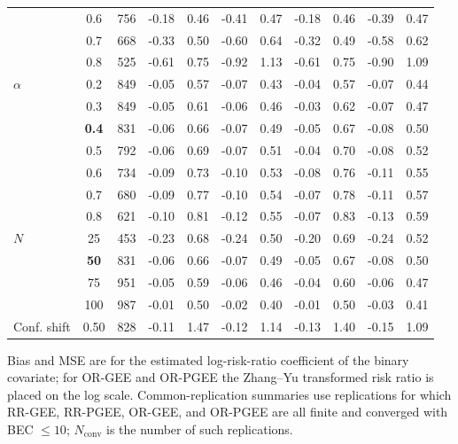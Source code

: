 \begin{table}[htbp]
\begin{tabular}{l c S[table-format=3.0] *{4}{S[table-format=-2.2] S[table-format=5.2]}}
 & 0.6 & 756 & -0.18 & 0.46 & -0.41 & 0.47 & -0.18 & 0.46 & -0.39 & 0.47 \\
 & 0.7 & 668 & -0.33 & 0.50 & -0.60 & 0.64 & -0.32 & 0.49 & -0.58 & 0.62 \\
 & 0.8 & 525 & -0.61 & 0.75 & -0.92 & 1.13 & -0.61 & 0.75 & -0.90 & 1.09 \\
\midrule
$\alpha$ & 0.2 & 849 & -0.05 & 0.57 & -0.07 & 0.43 & -0.04 & 0.57 & -0.07 & 0.44 \\
 & 0.3 & 849 & -0.05 & 0.61 & -0.06 & 0.46 & -0.03 & 0.62 & -0.07 & 0.47 \\
 & \textbf{0.4} & 831 & -0.06 & 0.66 & -0.07 & 0.49 & -0.05 & 0.67 & -0.08 & 0.50 \\
 & 0.5 & 792 & -0.06 & 0.69 & -0.07 & 0.51 & -0.04 & 0.70 & -0.08 & 0.52 \\
 & 0.6 & 734 & -0.09 & 0.73 & -0.10 & 0.53 & -0.08 & 0.76 & -0.11 & 0.55 \\
 & 0.7 & 680 & -0.09 & 0.77 & -0.10 & 0.54 & -0.07 & 0.78 & -0.11 & 0.57 \\
 & 0.8 & 621 & -0.10 & 0.81 & -0.12 & 0.55 & -0.07 & 0.83 & -0.13 & 0.59 \\
\midrule
$N$ & 25 & 453 & -0.23 & 0.68 & -0.24 & 0.50 & -0.20 & 0.69 & -0.24 & 0.52 \\
 & \textbf{50} & 831 & -0.06 & 0.66 & -0.07 & 0.49 & -0.05 & 0.67 & -0.08 & 0.50 \\
 & 75 & 951 & -0.05 & 0.59 & -0.06 & 0.46 & -0.04 & 0.60 & -0.06 & 0.47 \\
 & 100 & 987 & -0.01 & 0.50 & -0.02 & 0.40 & -0.01 & 0.50 & -0.03 & 0.41 \\
\midrule
Conf. shift & 0.50 & 828 & -0.11 & 1.47 & -0.12 & 1.14 & -0.13 & 1.40 & -0.15 & 1.09 \\
\bottomrule
\end{tabular}
\begin{flushleft}
\footnotesize Bias and MSE are for the estimated log-risk-ratio coefficient of the binary covariate; for OR-GEE and OR-PGEE the Zhang--Yu transformed risk ratio is placed on the log scale. Common-replication summaries use replications for which RR-GEE, RR-PGEE, OR-GEE, and OR-PGEE are all finite and converged with BEC $\leq 10$; $N_{\mathrm{conv}}$ is the number of such replications.
\end{flushleft}
\end{table}

